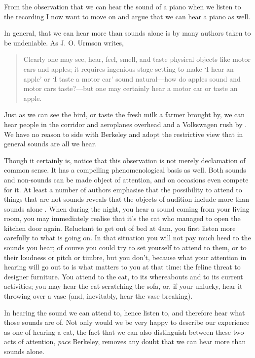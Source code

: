 \documentclass[sloppy, journal, git, bytitle, dodraft]{humapap}
\begin{document}

\sect From the observation that we can hear the sound of a piano when we listen to the recording I now want to move on and argue that we can hear a piano as well. 

In general, that we can hear more than sounds alone is by many authors taken to be undeniable. As J. O. Urmson writes, 
\begin{quote}
Clearly one may see, hear, feel, smell, and taste physical objects like motor cars and apples; it requires ingenious stage setting to make `I hear an apple' or `I taste a motor car' sound natural---how do apples sound and motor cars taste?---but one may certainly hear a motor car or taste an apple.\autocite[p. 117]{urmson1968aa}
\end{quote} Just as we can see the bird, or taste the fresh milk a farmer brought by, we can hear people in the corridor and aeroplanes overhead and a Volkswagen rush by \autocite{heidegger}. We have no reason to side with Berkeley and adopt the restrictive view that in general sounds are all we hear. 

Though it certainly is, notice that this observation is not merely declamation  of common sense. It has a compelling phenomenological basis as well. Both sounds and non-sounds can be made object of attention, and on occasions even compete for it. At least a number of authors emphasise that the possibility to attend to things that are not sounds reveals that the objects of audition include more than sounds alone \autocite[See][]{nudds2010aa}.  
When during the night, you hear a sound coming from your living room, you may immediately realise that it's the cat who managed to open the kitchen door again. Reluctant to get out of bed at 4am, you first listen more carefully to what is going on. In that situation you will not pay much heed to the sounds you hear; of course you could try to set yourself to attend to them, or to their loudness or pitch or timbre, but you don't, because what your attention in hearing will go out to is what matters to you at that time: the feline threat to designer furniture. You attend to the cat, to its whereabouts and to its current activities; you may hear the cat scratching the sofa, or, if your unlucky, hear it throwing over a vase (and, inevitably, hear the vase breaking).

In hearing the sound we can attend to, hence listen to, and therefore hear what those sounds are of. Not only would we be very happy to describe our experience as one of hearing a cat, the fact that we can also distinguish between these two acts of attention, \emph{pace} Berkeley, removes any doubt that we can hear more than sounds alone.
\end{document}
